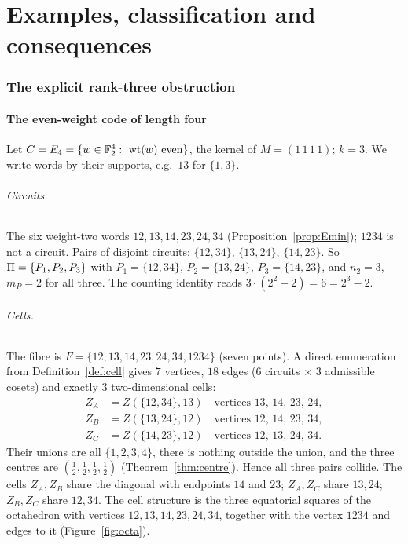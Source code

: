 \part{Examples, classification and consequences}

\section{The explicit rank-three obstruction}\label{sec:E4}

\subsection{The even-weight code of length four}

Let $C=E_4=\{w\in\F_2^4:\ \wt(w)\ \text{even}\}$, the kernel of $M=(1\,1\,1\,1)$; $k=3$. We write words by their supports, e.g.\ $13$ for $\{1,3\}$.

\paragraph{Circuits.} The six weight-two words $12,13,14,23,24,34$ (Proposition~\ref{prop:Emin}); $1234$ is not a circuit. Pairs of disjoint circuits: $\{12,34\}$, $\{13,24\}$, $\{14,23\}$. So $\Pi=\{P_1,P_2,P_3\}$ with $P_1=\{12,34\}$, $P_2=\{13,24\}$, $P_3=\{14,23\}$, and $n_2=3$, $m_P=2$ for all three. The counting identity reads $3\cdot(2^2-2)=6=2^3-2$.

\paragraph{Cells.} The fibre is $F=\{12,13,14,23,24,34,1234\}$ (seven points). A direct enumeration from Definition~\ref{def:cell} gives $7$ vertices, $18$ edges ($6$ circuits $\times$ $3$ admissible cosets) and exactly $3$ two-dimensional cells:
\begin{align*}
Z_A&=Z(\{12,34\},13)\quad\text{vertices }13,\,14,\,23,\,24,\\
Z_B&=Z(\{13,24\},12)\quad\text{vertices }12,\,14,\,23,\,34,\\
Z_C&=Z(\{14,23\},12)\quad\text{vertices }12,\,13,\,24,\,34.
\end{align*}
Their unions are all $\{1,2,3,4\}$, there is nothing outside the union, and the three centres are $(\tfrac12,\tfrac12,\tfrac12,\tfrac12)$ (Theorem~\ref{thm:centre}). Hence all three pairs collide. The cells $Z_A,Z_B$ share the diagonal with endpoints $14$ and $23$; $Z_A,Z_C$ share $13,24$; $Z_B,Z_C$ share $12,34$. The cell structure is the three equatorial squares of the octahedron with vertices $12,13,14,23,24,34$, together with the vertex $1234$ and edges to it (Figure~\ref{fig:octa}).

